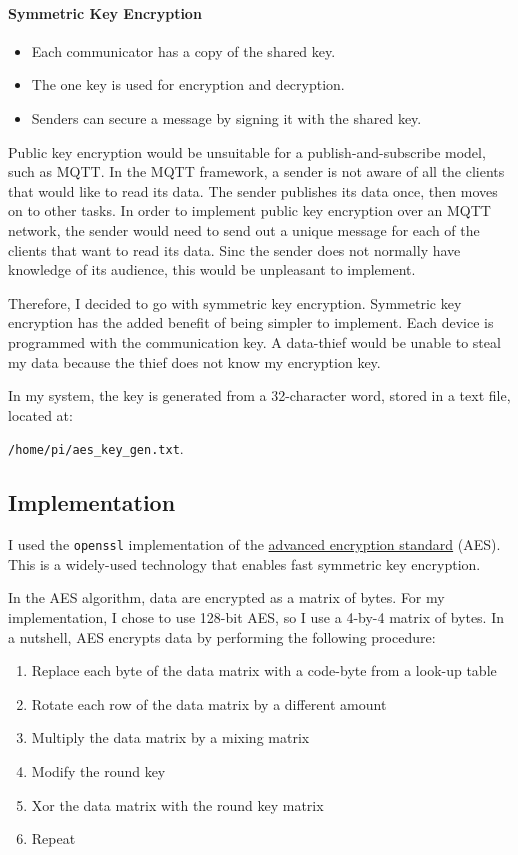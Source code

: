 \documentclass[final,titlepage,onecolumn]{article}
\begin{document}
\paragraph{Symmetric Key Encryption}
\begin{itemize}
	\item Each communicator has a copy of the shared key.
	\item The one key is used for encryption and decryption.
	\item Senders can secure a message by signing it with the shared key.
\end{itemize}

Public key encryption would be unsuitable for a publish-and-subscribe model, such as MQTT. In the MQTT framework, a sender is not aware of all the clients that would like to read its data. The sender publishes its data once, then moves on to other tasks. In order to implement public key encryption over an MQTT network, the sender would need to send out a unique message for each of the clients that want to read its data. Sinc the sender does not normally have knowledge of its audience, this would be unpleasant to implement.

Therefore, I decided to go with symmetric key encryption. Symmetric key encryption has the added benefit of being simpler to implement. Each device is programmed with the communication key. A data-thief would be unable to steal my data because the thief does not know my encryption key.

In my system, the key is generated from a 32-character word, stored in a  text file, located at:

\texttt{/home/pi/aes\_key\_gen.txt}. 

\subsection{Implementation}
I used the \texttt{openssl} implementation of the \href{https://www.youtube.com/watch?v=O4xNJsjtN6E}{advanced encryption standard} (AES). This is a widely-used technology that enables fast symmetric key encryption.

In the AES algorithm, data are encrypted as a matrix of bytes. For my implementation, I chose to use 128-bit AES, so I use a 4-by-4 matrix of bytes. In a nutshell, AES encrypts data by performing the following procedure:
\begin{enumerate}
	\item Replace each byte of the data matrix with a code-byte from a look-up table
	\item Rotate each row of the data matrix by a different amount
	\item Multiply the data matrix by a mixing matrix
	\item Modify the round key
	\item Xor the data matrix with the round key matrix
	\item Repeat
\end{enumerate}
\end{document}

